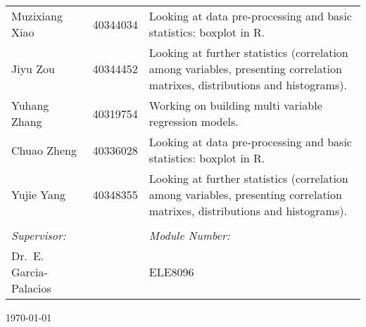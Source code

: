 \begin{titlepage}
\begin{center}
\begin{table}[H]
\begin{tabularx}{\textwidth}{llX}
            Muzixiang Xiao & 40344034 & Looking at data pre-processing and basic statistics: boxplot in R.\\
            Jiyu Zou & 40344452 & Looking at further statistics (correlation among variables, presenting correlation matrixes, distributions and histograms).\\
            Yuhang Zhang & 40319754 & Working on building multi variable regression models.\\
            Chuao Zheng & 40336028 & Looking at data pre-processing and basic statistics: boxplot in R.\\
            Yujie Yang & 40348355 &  Looking at further statistics (correlation among variables, presenting correlation matrixes, distributions and histograms).\\
            &&\\
            \emph{Supervisor:}&&\emph{Module Number:} \\
            Dr.~E. Garcia-Palacios && ELE8096
        \end{tabularx}
    \end{table}

    \vfill
    
    {\large \today}
    
    \end{center}
    
    \end{titlepage}